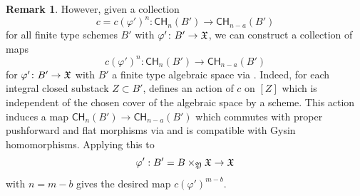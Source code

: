 \documentclass[a4paper,12pt]{article} %
\theoremstyle{definition}
\newtheorem{remark}[definition]{Remark}
\theoremstyle{plain}%
\renewcommand{\phi}{\varphi}
\newcommand{\Chow}{\mathsf{CH}}
\begin{document}
\begin{remark}
However, given a collection 
$$c= c(\phi')^{n}\colon \Chow_{n}(B') \to  \Chow_{n-a}(B') $$ for all finite type schemes $B'$ with $\phi'\colon B' \to \frak X$, we can construct  a collection of maps $${c}(\phi')^n\colon \Chow_{n}(B') \to \Chow_{n-a}(B')$$ for $\phi'\colon B' \to \frak X$ with $B'$ a finite type algebraic space via \cite[Section 5.1]{Vistoli1989Intersection-th}. Indeed, for each integral closed substack $Z \subset B'$, \cite[Section 5.1]{Vistoli1989Intersection-th} defines an action of $c$ on $[Z]$ which is independent of the chosen cover of the algebraic space by a scheme. This action induces a map 
$\Chow_{n}(B') \to \Chow_{n-a}(B')$
which commutes with proper pushforward and flat morphisms via \cite[Lemma 5.3]{Vistoli1989Intersection-th} and is compatible with Gysin homomorphisms. Applying this to $$\phi' : B' = B \times_{\frak Y} \frak X \to \frak X$$
with $n=m-b$ gives the desired map ${c}(\phi')^{m-b}$.
\end{remark}
\vspace{8pt}
\end{document}
